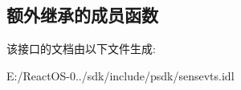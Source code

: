 \subsection*{额外继承的成员函数}


该接口的文档由以下文件生成\+:\begin{DoxyCompactItemize}
\item 
E\+:/\+React\+O\+S-\/0../sdk/include/psdk/sensevts.\+idl\end{DoxyCompactItemize}
